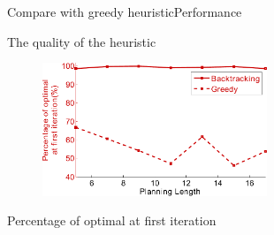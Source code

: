 \begin{frame}{Compare with greedy heuristic}{Performance}

\begin{center}
The quality of the heuristic 
\end{center}


\begin{figure}
\centering
\includegraphics[width=0.6\textwidth]{./figure/compareGreedy}
\end{figure}

\begin{center}
{\small 
\textcolor{metric-OFI}{Percentage of optimal at first iteration}
}
\end{center}

\end{frame}

